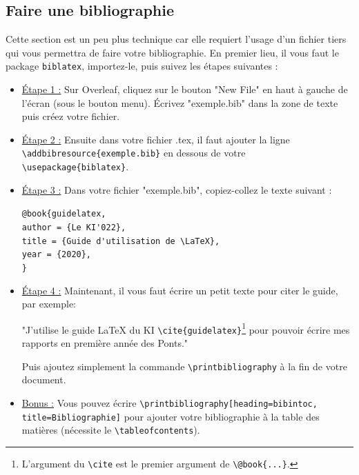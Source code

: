 \documentclass[11pt]{article}				%
\newcommand{\tb}{\textbackslash}
\newcommand{\cmd}[2]{\texttt{\textbackslash #1}\texttt{\{#2\}}}
\begin{document}
\clearpage
\subsection*{Faire une bibliographie}

Cette section est un peu plus technique car elle requiert l'usage d'un fichier tiers qui vous permettra de faire votre bibliographie. En premier lieu, il vous faut le package \verb|biblatex|, importez-le, puis suivez les étapes suivantes :

\begin{itemize}
	\item \underline{Étape 1 :} Sur Overleaf, cliquez sur le bouton "New File" en haut à gauche de l'écran (sous le bouton menu). Écrivez "exemple.bib" dans la zone de texte puis créez votre fichier.\\
	
	\item \underline{Étape 2 :} Ensuite dans votre fichier .tex, il faut ajouter la ligne \cmd{addbibresource}{exemple.bib} en dessous de votre \cmd{usepackage}{biblatex}.\\
	
	\item \underline{Étape 3 :} Dans votre fichier "exemple.bib", copiez-collez le texte suivant :
	\begin{flushleft}
		\verb|@book{guidelatex,| \\
		\qquad \quad	\verb|author = {Le KI'022},| \\
		\qquad	\quad \verb|title = {Guide d'utilisation de \LaTeX},| \\
		\qquad  \quad \verb|year = {2020},| \\
		\verb|}| \\
		
	\end{flushleft}
	
	\item \underline{Étape 4 :} Maintenant, il vous faut écrire un petit texte pour citer le guide, par exemple:
	
	"J'utilise le guide LaTeX du KI \cmd{cite}{guidelatex}\footnote{L'argument du \texttt{\tb cite} est le premier argument de \texttt{\tb @book\{...\}}.} pour pouvoir écrire mes rapports en première année des Ponts."
	
	Puis ajoutez simplement la commande \verb|\printbibliography| à la fin de votre document.\\
	
	\item \underline{Bonus :} Vous pouvez écrire \verb|\printbibliography[heading=bibintoc, title=Bibliographie]| pour ajouter votre bibliographie à la table des matières (nécessite le \verb|\tableofcontents|).
	
\end{itemize}
\end{document}
